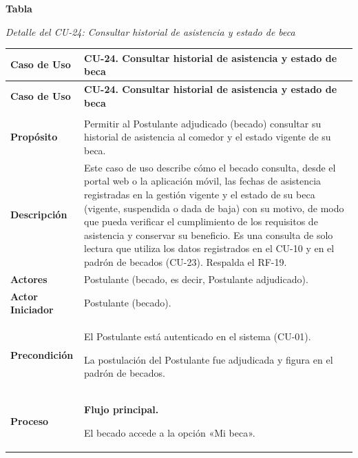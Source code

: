 \label{tab:detalle_cu24}
\noindent\textbf{Tabla~\thetable}\par\nopagebreak
\noindent\textit{Detalle del CU-24: Consultar historial de asistencia y estado de beca}\par\nopagebreak
\begingroup\small\linespread{1}\selectfont
\begin{longtable}{>{\raggedright\arraybackslash}p{2.9cm} >{\raggedright\arraybackslash}p{12.6cm}}
\toprule
\textbf{Caso de Uso} & \textbf{CU-24. Consultar historial de asistencia y estado de beca} \\
\midrule
\endfirsthead
\toprule
\textbf{Caso de Uso} & \textbf{CU-24. Consultar historial de asistencia y estado de beca} \\
\midrule
\endhead
\endfoot
\bottomrule
\multicolumn{2}{l}{\textit{Nota.} Elaboración propia.} \\
\endlastfoot
\textbf{Propósito} & Permitir al Postulante adjudicado (becado) consultar su historial de asistencia al comedor y el estado vigente de su beca. \\
\midrule
\textbf{Descripción} & Este caso de uso describe cómo el becado consulta, desde el portal web o la aplicación móvil, las fechas de asistencia registradas en la gestión vigente y el estado de su beca (vigente, suspendida o dada de baja) con su motivo, de modo que pueda verificar el cumplimiento de los requisitos de asistencia y conservar su beneficio. Es una consulta de solo lectura que utiliza los datos registrados en el CU-10 y en el padrón de becados (CU-23). Respalda el RF-19. \\
\midrule
\textbf{Actores} & Postulante (becado, es decir, Postulante adjudicado). \\
\midrule
\textbf{Actor Iniciador} & Postulante (becado). \\
\midrule
\textbf{Precondición} & \vspace{-\baselineskip}\begin{cuvin}
    \item El Postulante está autenticado en el sistema (CU-01).
    \item La postulación del Postulante fue adjudicada y figura en el padrón de becados.
\end{cuvin} \\
\midrule
\textbf{Proceso} & \textbf{Flujo principal.}
\begin{cupasos}
    \item El becado accede a la opción «Mi beca».

\end{cupasos}
\end{longtable}
